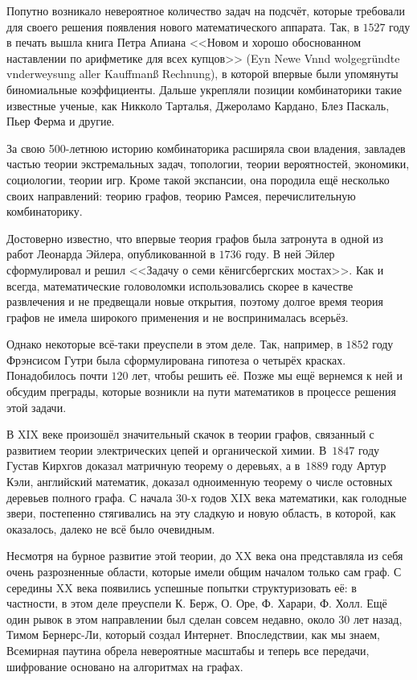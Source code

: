 	Попутно возникало невероятное количество задач на подсчёт, которые требовали для своего решения появления нового математического аппарата. Так, в $1527$ году в печать вышла книга Петра Апиана <<Новом и хорошо обоснованном наставлении по арифметике для всех купцов>> (Eyn Newe Vnnd wolgegründte vnderweysung aller Kauffmanß Rechnung), в которой впервые были упомянуты биномиальные коэффициенты. Дальше укрепляли позиции комбинаторики такие известные ученые, как Никколо Тарталья, Джероламо Кардано, Блез Паскаль, Пьер Ферма и другие.
	
	За свою 500-летнюю историю комбинаторика расширяла свои владения, завладев частью теории экстремальных задач, топологии, теории вероятностей, экономики, социологии, теории игр. Кроме такой экспансии, она породила ещё несколько своих направлений: теорию графов, теорию Рамсея, перечислительную комбинаторику.
	
	Достоверно известно, что впервые теория графов была затронута в одной из работ Леонарда Эйлера, опубликованной в $1736$ году. В ней Эйлер сформулировал и решил <<Задачу о семи кёнигсбергских мостах>>. Как и всегда, математические головоломки использовались скорее в качестве развлечения и не предвещали новые открытия, поэтому долгое время теория графов не имела широкого применения и не воспринималась всерьёз.  

	Однако некоторые всё-таки преуспели в этом деле. Так, например, в $1852$ году Фрэнсисом Гутри была сформулирована гипотеза о четырёх красках. Понадобилось почти $120$ лет, чтобы решить её. Позже мы ещё вернемся к ней и обсудим преграды, которые возникли на пути математиков в процессе решения этой задачи.
	
	В XIX веке произошёл значительный скачок в теории графов, связанный с развитием теории электрических цепей и органической химии. В~$1847$ году Густав Кирхгов доказал матричную теорему о деревьях, а в~$1889$ году Артур Кэли, английский математик, доказал одноименную теорему о числе остовных деревьев полного графа. С начала $30$-х годов XIX века математики, как голодные звери, постепенно стягивались на эту сладкую и новую область, в которой, как оказалось, далеко не всё было очевидным.
	
	Несмотря на бурное развитие этой теории, до XX века она представляла из себя очень разрозненные области, которые имели общим началом только сам граф. С середины XX века появились успешные попытки структуризовать её: в частности, в этом деле преуспели К. Берж, О. Оре, Ф. Харари, Ф. Холл. Ещё один рывок в этом направлении был сделан совсем недавно, около 30 лет назад, Тимом Бернерс-Ли, который создал Интернет. Впоследствии, как мы знаем, Всемирная паутина обрела невероятные масштабы и теперь все передачи, шифрование основано на алгоритмах на графах.
	
